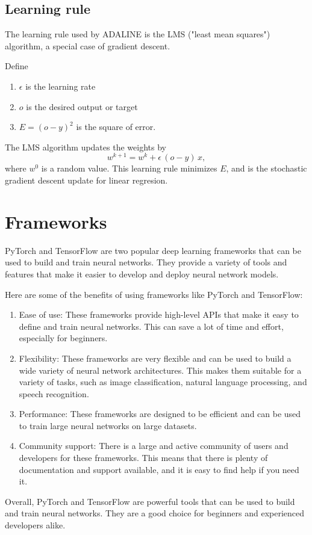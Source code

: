\documentclass[10pt,a4paper]{article}
\begin{document}
\subsection{Learning rule}
The learning rule used by ADALINE is the LMS ("least mean squares") algorithm, a special case of gradient descent.

Define
\begin{enumerate}
	\item $\epsilon$ is the learning rate
	\item $o$ is the desired output or target
	\item $E = (o - y)^{2}$ is the square of error.
\end{enumerate}

The LMS algorithm updates the weights by
\begin{equation}
	w^{k+1} = w^{k} + \epsilon \, (o - y) \, x,
\end{equation}
where $w^{0}$ is a random value. This learning rule minimizes $E$, and is the stochastic gradient descent update for linear regresion.

\section{Frameworks}

PyTorch and TensorFlow are two popular deep learning frameworks that can be used to build and train neural networks. They provide a variety of tools and features that make it easier to develop and deploy neural network models.

Here are some of the benefits of using frameworks like PyTorch and TensorFlow:

\begin{enumerate}
	\item Ease of use: These frameworks provide high-level APIs that make it easy to define and train neural networks. This can save a lot of time and effort, especially for beginners.
	\item Flexibility: These frameworks are very flexible and can be used to build a wide variety of neural network architectures. This makes them suitable for a variety of tasks, such as image classification, natural language processing, and speech recognition.
	\item Performance: These frameworks are designed to be efficient and can be used to train large neural networks on large datasets.
	\item Community support: There is a large and active community of users and developers for these frameworks. This means that there is plenty of documentation and support available, and it is easy to find help if you need it.
\end{enumerate}
Overall, PyTorch and TensorFlow are powerful tools that can be used to build and train neural networks. They are a good choice for beginners and experienced developers alike.
\end{document}
